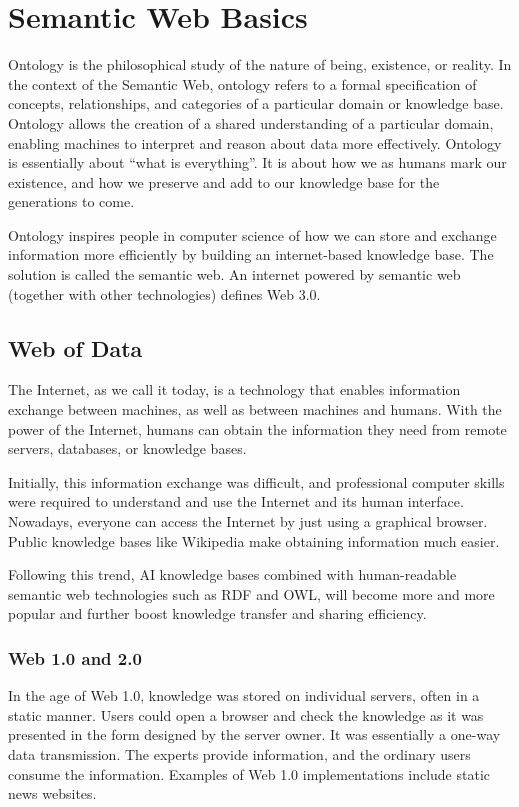 \chapter{Semantic Web Basics} \label{ch:briefintrosemanticweb}

Ontology is the philosophical study of the nature of being, existence, or reality. In the context of the Semantic Web, ontology refers to a formal specification of concepts, relationships, and categories of a particular domain or knowledge base. Ontology allows the creation of a shared understanding of a particular domain, enabling machines to interpret and reason about data more effectively. Ontology is essentially about “what is everything”. It is about how we as humans mark our existence, and how we preserve and add to our knowledge base for the generations to come.

Ontology inspires people in computer science of how we can store and exchange information more efficiently by building an internet-based knowledge base. The solution is called the semantic web. An internet powered by semantic web (together with other technologies) defines Web 3.0.

\section{Web of Data}

The Internet, as we call it today, is a technology that enables information exchange between machines, as well as between machines and humans. With the power of the Internet, humans can obtain the information they need from remote servers, databases, or knowledge bases.

Initially, this information exchange was difficult, and professional computer skills were required to understand and use the Internet and its human interface. Nowadays, everyone can access the Internet by just using a graphical browser. Public knowledge bases like Wikipedia make obtaining information much easier.

Following this trend, AI knowledge bases combined with human-readable semantic web technologies such as RDF and OWL, will become more and more popular and further boost knowledge transfer and sharing efficiency.

\subsection{Web 1.0 and 2.0}

In the age of Web 1.0, knowledge was stored on individual servers, often in a static manner. Users could open a browser and check the knowledge as it was presented in the form designed by the server owner. It was essentially a one-way data transmission. The experts provide information, and the ordinary users consume the information. Examples of Web 1.0 implementations include static news websites.

